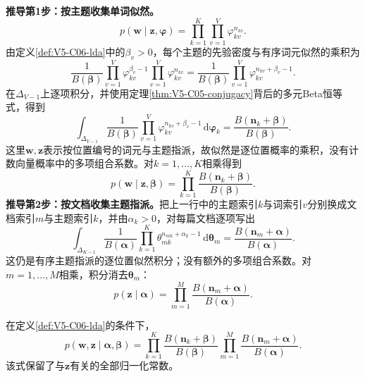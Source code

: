 \textbf{推导第1步：按主题收集单词似然。}
\[
p(\boldsymbol w\mid\boldsymbol z,\boldsymbol\varphi)
=\prod_{k=1}^{K}\prod_{v=1}^{V}\varphi_{kv}^{n_{kv}}.
\]
由定义\ref{def:V5-C06-lda}中的$\beta_v>0$，每个主题的先验密度与有序词元似然的乘积为
\[
\frac1{B(\boldsymbol\beta)}
\prod_{v=1}^V\varphi_{kv}^{\beta_v-1}
\prod_{v=1}^V\varphi_{kv}^{n_{kv}}
=\frac1{B(\boldsymbol\beta)}
\prod_{v=1}^V\varphi_{kv}^{n_{kv}+\beta_v-1}.
\]
在$\Delta_{V-1}$上逐项积分，并使用定理\ref{thm:V5-C05-conjugacy}背后的多元Beta恒等式，得到
\[
\int_{\Delta_{V-1}}
\frac1{B(\boldsymbol\beta)}
\prod_{v=1}^V\varphi_{kv}^{n_{kv}+\beta_v-1}
\,\mathrm d\boldsymbol\varphi_k
=\frac{B(\boldsymbol n_k+\boldsymbol\beta)}{B(\boldsymbol\beta)}.
\]
这里$\boldsymbol w,\boldsymbol z$表示按位置编号的词元与主题指派，故似然是逐位置概率的乘积，没有计数向量概率中的多项组合系数。对$k=1,\ldots,K$相乘得到
\begin{equation}
p(\boldsymbol w\mid\boldsymbol z,\boldsymbol\beta)
=\prod_{k=1}^{K}
\frac{B(\boldsymbol n_k+\boldsymbol\beta)}{B(\boldsymbol\beta)}.
\label{eq:V5-C06-collapsed-word}
\end{equation}
\textbf{推导第2步：按文档收集主题指派。}把上一行中的主题索引$k$与词索引$v$分别换成文档索引$m$与主题索引$k$，并由$\alpha_k>0$，对每篇文档逐项写出
\[
\int_{\Delta_{K-1}}
\frac1{B(\boldsymbol\alpha)}
\prod_{k=1}^K\theta_{mk}^{n_{mk}+\alpha_k-1}
\,\mathrm d\boldsymbol\theta_m
=\frac{B(\boldsymbol n_m+\boldsymbol\alpha)}{B(\boldsymbol\alpha)}.
\]
这仍是有序主题指派的逐位置似然积分；没有额外的多项组合系数。对$m=1,\ldots,M$相乘，积分消去$\boldsymbol\theta_m$：
\begin{equation}
p(\boldsymbol z\mid\boldsymbol\alpha)
=\prod_{m=1}^{M}
\frac{B(\boldsymbol n_m+\boldsymbol\alpha)}{B(\boldsymbol\alpha)}.
\label{eq:V5-C06-collapsed-topic}
\end{equation}

\label{struct:V5-C06-CH12}
\begin{theorem}[LDA的折叠联合分布]\label{thm:V5-C06-collapsed-joint}
在定义\ref{def:V5-C06-lda}的条件下，
\begin{equation}
p(\boldsymbol w,\boldsymbol z\mid\boldsymbol\alpha,\boldsymbol\beta)
=\prod_{k=1}^{K}
\frac{B(\boldsymbol n_k+\boldsymbol\beta)}{B(\boldsymbol\beta)}
\prod_{m=1}^{M}
\frac{B(\boldsymbol n_m+\boldsymbol\alpha)}{B(\boldsymbol\alpha)}.
\label{eq:V5-C06-collapsed-joint}
\end{equation}
该式保留了与$\boldsymbol z$有关的全部归一化常数。
\end{theorem}
